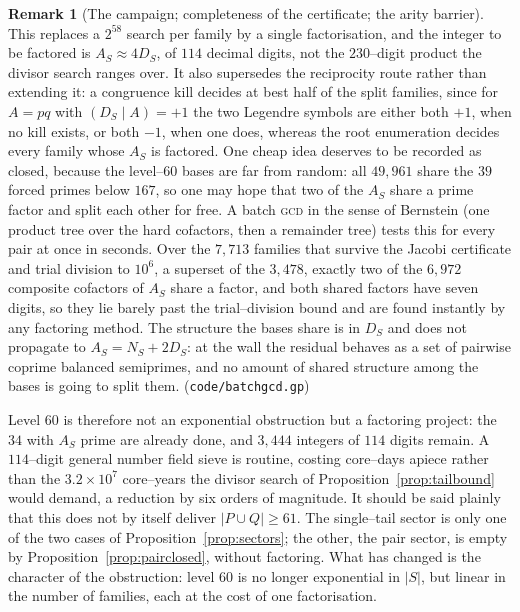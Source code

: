 \documentclass[11pt]{article}
\theoremstyle{definition}
\newtheorem{remark}[theorem]{Remark}
\begin{document}
\begin{remark}[The campaign; completeness of the certificate; the arity barrier]
This replaces a $2^{58}$ search per family by a single factorisation, and the integer to be factored is
$A_S\approx4D_S$, of $114$ decimal digits, not the $230$--digit product the divisor search ranges over.
It also supersedes the reciprocity route rather than extending it: a congruence kill decides at best
half of the split families, since for $A=pq$ with $(D_S\mid A)=+1$ the two Legendre symbols are either
both $+1$, when no kill exists, or both $-1$, when one does, whereas the root enumeration decides every
family whose $A_S$ is factored. One cheap idea deserves to be recorded as closed, because the level--$60$ bases are far from random:
all $49{,}961$ share the $39$ forced primes below $167$, so one may hope that two of the $A_S$ share a
prime factor and split each other for free. A batch \textsc{gcd} in the sense of Bernstein (one
product tree over the hard cofactors, then a remainder tree) tests this for every pair at once in
seconds. Over the $7{,}713$ families that survive the Jacobi certificate and trial division to $10^6$,
a superset of the $3{,}478$, exactly two of the $6{,}972$ composite cofactors of $A_S$ share a factor,
and both shared factors have seven digits, so they lie barely past the trial--division bound and are
found instantly by any factoring method. The structure the bases share is in $D_S$ and does not
propagate to $A_S=N_S+2D_S$: at the wall the residual behaves as a set of pairwise coprime balanced
semiprimes, and no amount of shared structure among the bases is going to split them.
\textup{(\texttt{code/batchgcd.gp})}

Level $60$ is therefore not an exponential obstruction but a factoring
project: the $34$ with $A_S$ prime are already done, and $3{,}444$ integers of $114$ digits remain.
A $114$--digit general number field sieve is routine, costing core--days apiece rather than the
$3.2\times10^7$ core--years the divisor search of Proposition~\ref{prop:tailbound} would demand, a
reduction by six orders of magnitude. It should be said plainly that this does not by itself deliver
$|P\cup Q|\ge61$. The single--tail sector is only one of the two cases of
Proposition~\ref{prop:sectors}; the other, the pair sector, is empty by Proposition~\ref{prop:pairclosed}, without
factoring. What has changed is the character of the obstruction: level $60$ is no
longer exponential in $|S|$, but linear in the number of families, each at the cost of one
factorisation.


\end{remark}
\end{document}
